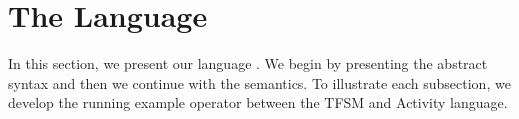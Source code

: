 \section{The Language}
In this section, we present our language \bcool. We begin by presenting the abstract syntax and then we continue with the semantics. To illustrate each subsection, we develop the running example operator between the TFSM and Activity language.





